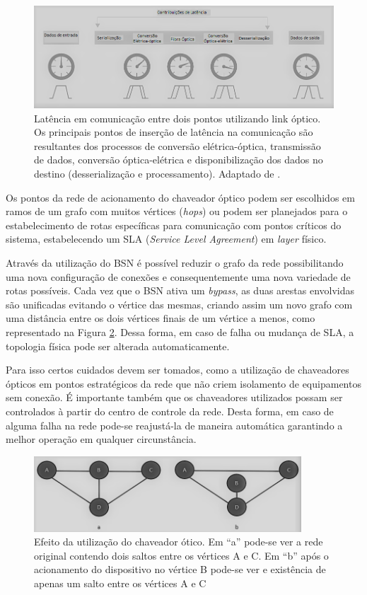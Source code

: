 \documentclass[12pt]{article}
\begin{document}
\begin{figure} %
	\centering
	\includegraphics[width=12cm]{latency_link}
	\caption{Latência em comunicação entre dois pontos utilizando link óptico. Os principais pontos de inserção de latência na comunicação são resultantes dos processos de conversão elétrica-óptica, transmissão de dados, conversão óptica-elétrica e disponibilização dos dados no destino (desserialização e processamento). Adaptado de \cite{Art_Coffey}.}
	\label{fig_latency_link}
\end{figure}

Os pontos da rede de acionamento do chaveador óptico podem ser escolhidos em ramos de um grafo com muitos vértices (\emph{hops}) ou podem ser planejados para o estabelecimento de rotas específicas para comunicação com pontos críticos do sistema, estabelecendo um SLA (\emph{Service Level Agreement}) em \emph{layer} físico.

Através da utilização do BSN é possível reduzir o grafo da rede possibilitando uma nova configuração de conexões e consequentemente uma nova variedade de rotas possíveis. Cada vez que o BSN ativa um \emph{bypass}, as duas arestas envolvidas são unificadas evitando o vértice das mesmas, criando assim um novo grafo com uma distância entre os dois vértices finais de um vértice a menos, como representado na Figura \ref{fig_bypass_exemplo}. Dessa forma, em caso de falha ou mudança de SLA, a topologia física pode ser alterada automaticamente.

Para isso certos cuidados devem ser tomados, como a utilização de chaveadores ópticos em pontos estratégicos da rede que não criem isolamento de equipamentos sem conexão. É importante também que os chaveadores utilizados possam ser controlados à partir do centro de controle da rede. Desta forma, em caso de alguma falha na rede pode-se reajustá-la de maneira automática garantindo a melhor operação em qualquer circunstância.

\begin{figure}[ht] %
	\centering
	\includegraphics[width=10cm]{Bypass_exemplo_PB}
	\caption{Efeito da utilização do chaveador ótico. Em ``a'' pode-se ver a rede original contendo dois saltos entre os vértices A e C. Em ``b'' após o acionamento do dispositivo no vértice B pode-se ver e existência de apenas um salto entre os vértices A e C}
	\label{fig_bypass_exemplo}
\end{figure}
\end{document}
